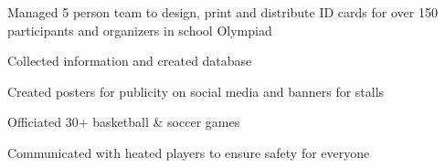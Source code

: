 \documentclass[]{deedy-resume-openfont}
\begin{document}
\begin{minipage}[t]{0.33\textwidth}
        \begin{tightemize}
            \item Managed 5 person team to design, print and distribute ID cards for over 150 participants and organizers in school Olympiad
            \item Collected information and created database
            \item Created posters for publicity on social media and banners for stalls
        \end{tightemize}
        
        
        \vspace{\topsep} %
        
        \begin{tightemize}
            \item Officiated 30+ basketball \& soccer games
            \item Communicated with heated players to ensure safety for everyone
        \end{tightemize}
        


\end{minipage}
\hfill
\end{document}
